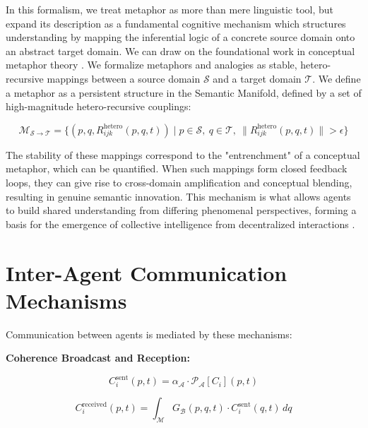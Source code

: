 In this formalism, we treat metaphor as more than mere linguistic tool, but expand its description as a fundamental cognitive mechanism which structures understanding by mapping the inferential logic of a concrete source domain onto an abstract target domain. We can draw on the foundational work in conceptual metaphor theory \autocite{LakoffJohnson1980, HofstadterSander2013}. We formalize metaphors and analogies as stable, hetero-recursive mappings between a source domain \(\mathcal{S}\) and a target domain \(\mathcal{T}\). We define a metaphor as a persistent structure in the Semantic Manifold, defined by a set of high-magnitude hetero-recursive couplings:

\begin{equation}
\mathcal{M}_{\mathcal{S} \to \mathcal{T}} = \{(p, q, R_{ijk}^{\text{hetero}}(p, q, t)) \mid p \in \mathcal{S},\ q \in \mathcal{T},\ \|R_{ijk}^{\text{hetero}}(p, q, t)\| > \epsilon\}
\end{equation}

The stability of these mappings correspond to the "entrenchment" of a conceptual metaphor, which can be quantified. When such mappings form closed feedback loops, they can give rise to cross-domain amplification and conceptual blending, resulting in genuine semantic innovation. This mechanism is what allows agents to build shared understanding from differing phenomenal perspectives, forming a basis for the emergence of collective intelligence from decentralized interactions \autocite{Surowiecki2004}.


\section{Inter-Agent Communication Mechanisms}
\label{14.3:inter_agent_communication_mechanisms}

Communication between agents is mediated by these mechanisms:

\textbf{Coherence Broadcast and Reception:}

\begin{equation}
C_i^{\mathrm{sent}}(p,t) = \alpha_{\mathcal{A}} \cdot \mathcal{P}_{\mathcal{A}}[C_i](p,t)
\end{equation}

\begin{equation}
C_i^{\mathrm{received}}(p,t) = \int_{\mathcal{M}} G_{\mathcal{B}}(p,q,t) \cdot C_i^{\mathrm{sent}}(q,t) \, dq
\end{equation}

